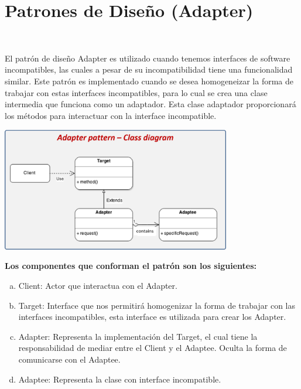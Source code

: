 \section{Patrones de Diseño (Adapter)} 
\textbf{}\\
\begin{flushleft}
El patrón de diseño Adapter es utilizado cuando tenemos interfaces de software incompatibles, las cuales a pesar de su incompatibilidad tiene una funcionalidad similar. Este patrón es implementado cuando se desea homogeneizar la forma de trabajar con estas interfaces incompatibles, para lo cual se crea una clase intermedia que funciona como un adaptador. Esta clase adaptador proporcionará los métodos para interactuar con la interface incompatible.


	\begin{center}
	\includegraphics[width=10cm]{./Imagenes/adapter} 
	\end{center}

\textbf{  Los componentes que conforman el patrón son los siguientes:}\\
\begin{enumerate}[a)]
\item Client: Actor que interactua con el Adapter.
\item Target: Interface que nos permitirá homogenizar la forma de trabajar con las interfaces incompatibles, esta interface es utilizada para crear los Adapter.
\item Adapter: Representa la implementación del Target, el cual tiene la responsabilidad de mediar entre el Client y el Adaptee. Oculta la forma de comunicarse con el Adaptee.
\item Adaptee: Representa la clase con interface incompatible.
                                                                                                                                                                                                             
\newpage



\end{enumerate}
\end{flushleft}
